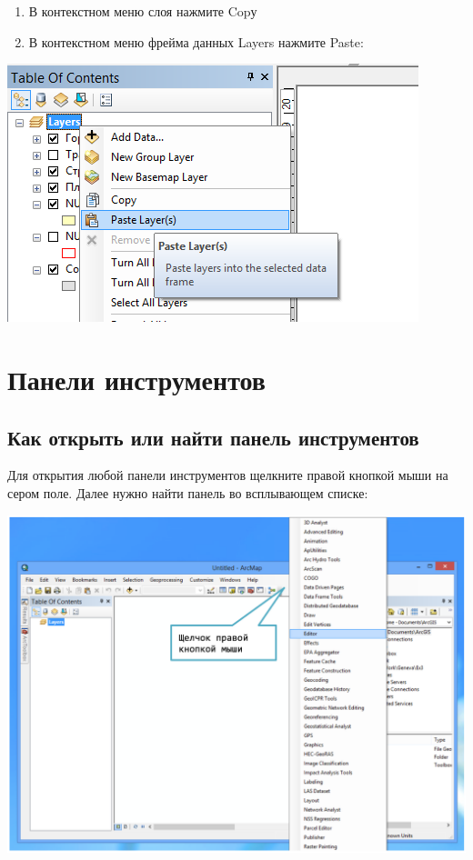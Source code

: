 \documentclass[]{book}
\theoremstyle{definition}
\theoremstyle{definition}
\theoremstyle{definition}
\theoremstyle{remark}
\begin{document}
\begin{enumerate}
\def\labelenumi{\arabic{enumi}.}
\item
  В контекстном меню слоя нажмите Copу
\item
  В контекстном меню фрейма данных Layers нажмите Paste:
\end{enumerate}

\includegraphics{images/Appendix/image14.png}

\hypertarget{manual-toolbar}{%
\chapter{Панели инструментов}\label{manual-toolbar}}

\hypertarget{-----}{%
\section{Как открыть или найти панель инструментов}\label{-----}}

Для открытия любой панели инструментов щелкните правой кнопкой мыши на
сером поле. Далее нужно найти панель во всплывающем списке:

\includegraphics{images/Appendix/image3.png}
\end{document}
